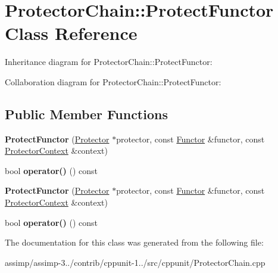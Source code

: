 \hypertarget{class_protector_chain_1_1_protect_functor}{\section{Protector\+Chain\+:\+:Protect\+Functor Class Reference}
\label{class_protector_chain_1_1_protect_functor}
}


Inheritance diagram for Protector\+Chain\+:\+:Protect\+Functor\+:


Collaboration diagram for Protector\+Chain\+:\+:Protect\+Functor\+:
\subsection*{Public Member Functions}
\begin{DoxyCompactItemize}
\item 
\hypertarget{class_protector_chain_1_1_protect_functor_a69e65b3ba5261ef1a00270e8e591bc43}{{\bfseries Protect\+Functor} (\hyperlink{class_protector}{Protector} $\ast$protector, const \hyperlink{class_functor}{Functor} \&functor, const \hyperlink{class_protector_context}{Protector\+Context} \&context)}\label{class_protector_chain_1_1_protect_functor_a69e65b3ba5261ef1a00270e8e591bc43}

\item 
\hypertarget{class_protector_chain_1_1_protect_functor_a066f866061e8301bbe0122253e1f49e6}{bool {\bfseries operator()} () const }\label{class_protector_chain_1_1_protect_functor_a066f866061e8301bbe0122253e1f49e6}

\item 
\hypertarget{class_protector_chain_1_1_protect_functor_a69e65b3ba5261ef1a00270e8e591bc43}{{\bfseries Protect\+Functor} (\hyperlink{class_protector}{Protector} $\ast$protector, const \hyperlink{class_functor}{Functor} \&functor, const \hyperlink{class_protector_context}{Protector\+Context} \&context)}\label{class_protector_chain_1_1_protect_functor_a69e65b3ba5261ef1a00270e8e591bc43}

\item 
\hypertarget{class_protector_chain_1_1_protect_functor_a066f866061e8301bbe0122253e1f49e6}{bool {\bfseries operator()} () const }\label{class_protector_chain_1_1_protect_functor_a066f866061e8301bbe0122253e1f49e6}

\end{DoxyCompactItemize}


The documentation for this class was generated from the following file\+:\begin{DoxyCompactItemize}
\item 
assimp/assimp-\/3../contrib/cppunit-\/1../src/cppunit/Protector\+Chain.\+cpp\end{DoxyCompactItemize}
